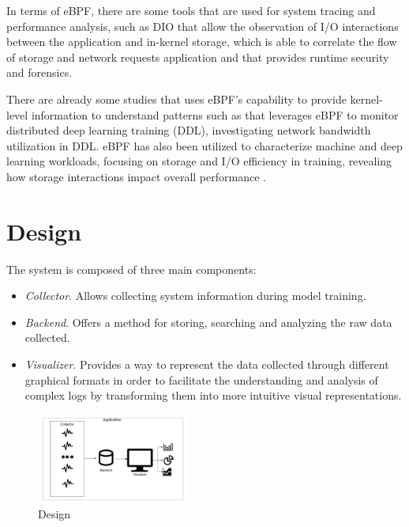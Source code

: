 \documentclass[conference]{IEEEtran}
\begin{document}
In terms of eBPF, there are some tools that are used for system tracing and performance analysis,
such as DIO \cite{DIO} that allow the observation of I/O interactions between the application and in-kernel storage,
\cite{CAT} which is able to correlate the flow of storage and network requests application and \cite{tracee} that provides runtime security and forensics.  

There are already some studies that uses eBPF's capability to provide kernel-level information to understand patterns such as \cite{eBPFDLNetwork} that
leverages eBPF to monitor distributed deep learning training (DDL), investigating network bandwidth utilization in DDL.
eBPF has also been utilized to characterize machine and deep learning workloads, focusing on storage and I/O efficiency in training,
revealing how storage interactions impact overall performance \cite{OanaDL, OanaML}.

\section{Design}
The system is composed of three main components:
\begin{itemize}
	\item \textit{Collector}. Allows collecting system information during model training.
	\item \textit{Backend}. Offers a method for storing, searching and analyzing the raw data collected.
	\item \textit{Visualizer}. Provides a way to represent the data collected through different graphical formats in order to facilitate the understanding and analysis of complex logs by transforming them into more intuitive visual representations.
\end{itemize}

\begin{figure}[htbp]
    \centering
	\includegraphics[width=0.45\textwidth]{images/DesignPIV3.pdf}
    \caption{Design}
    \label{fig:Design}
\end{figure}
\end{document}
